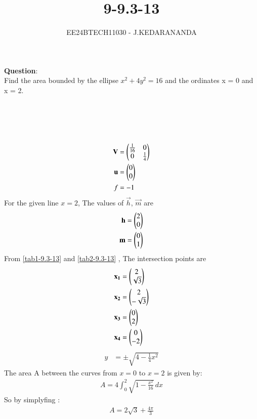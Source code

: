 \documentclass[journal]{IEEEtran}
\numberwithin{equation}{enumi}
\numberwithin{figure}{enumi}
\begin{document}

\title{9-9.3-13}
\author{EE24BTECH11030 - J.KEDARANANDA}
{\let\newpage\relax\maketitle}
\textbf{Question}:\\
Find the area bounded by the ellipse $x^2 + 4y^2 = 16$ and the ordinates x = 0 and x = 2.
\\
\solution \\
\begin{table}[h!]    
  \centering
  
  \caption{}
  \label{tab1-9.3-13}
\end{table}\\
\begin{table}[h!]    
  \centering
  
  \caption{}
  \label{tab2-9.3-13}
\end{table}\\
\begin{align}
\mathbf{V}&=\begin{pmatrix}\frac{1}{16} & 0\\0 & \frac{1}{4}\end{pmatrix}\\
\mathbf{u}&=\begin{pmatrix}0\\0\end{pmatrix}\\
f&=-1
\end{align}
For the given line $x=2$, The values of $\vec{h}$, $\vec{m}$ are
\begin{align}
\mathbf{h}&=\begin{pmatrix}2\\0\end{pmatrix}\\
\mathbf{m}&=\begin{pmatrix}0\\1\end{pmatrix}
\end{align}
From \ref{tab1-9.3-13} and \ref{tab2-9.3-13} , The intersection points are
\begin{align}
\mathbf{x_1} &= \begin{pmatrix}2\\\sqrt{3}\end{pmatrix}\\
\mathbf{x_2} &= \begin{pmatrix}2\\-\sqrt{3}\end{pmatrix}\\
\mathbf{x_3} &= \begin{pmatrix}0\\2\end{pmatrix}\\
\mathbf{x_4} &= \begin{pmatrix}0\\-2\end{pmatrix}
\end{align}
\begin{align}
y &= \pm \sqrt{4 - \frac{1}{4}x^2}
\end{align}
The area A  between the curves from \( x = 0 \) to \( x = 2 \) is given by:
\begin{align}
A = 4 \int_0^2 \sqrt{1 - \frac{x^2}{16}} \, dx
\end{align}
So by simplyfing :
\begin{align}
A = 2\sqrt{3} + \frac{4\pi}{3}
\end{align}
\end{document}
